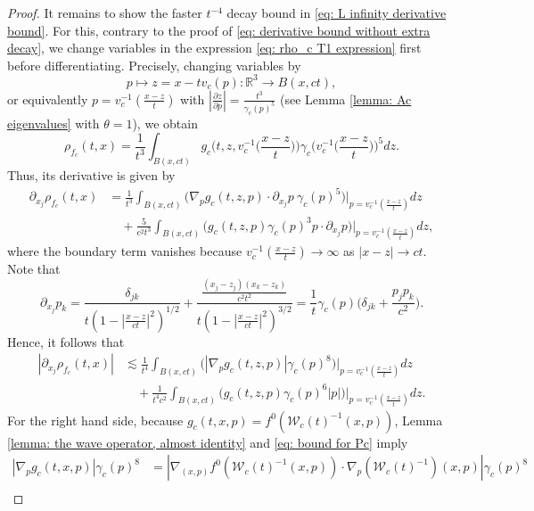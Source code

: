 \documentclass[reqno, 11pt, letterpaper]{amsart}
\theoremstyle{remark}
\numberwithin{equation}{section}
\numberwithin{theorem}{section}
\numberwithin{table}{section}
\numberwithin{figure}{section}
\begin{document}
\begin{proof}
It remains to show the faster $t^{-4}$ decay bound in \eqref{eq: L infinity derivative bound}. For this, contrary to the proof of \eqref{eq: derivative bound without extra decay}, we change variables in the expression \eqref{eq: rho_c T1 expression} first before differentiating. Precisely, changing variables by
$$p\mapsto z=x-tv_c(p):\mathbb{R}^3\to B(x,ct),$$
or equivalently $p=v_c^{-1}\left ( \frac{x-z}{t} \right )$ with $|\frac{\partial z}{\partial p}|=\frac{t^3}{\gamma_c(p)^5}$ (see Lemma \ref{lemma: Ac eigenvalues} with $\theta=1$), we obtain
\begin{equation}\label{eq: fc wave operator formulation, density}
\rho_{f_c}(t,x)=\frac{1}{t^3}\int_{B(x,ct)} g_c\bigg(t, z,v_c^{-1}\bigg(\frac{x-z}{t}\bigg)\bigg)\gamma_c \bigg(v_c^{-1}\bigg(\frac{x-z}{t}\bigg)\bigg)^5 dz.
\end{equation}
Thus, its derivative is given by
$$\begin{aligned}
\partial_{x_j}\rho_{f_c}(t,x)&=\frac{1}{t^3}\int_{B(x,ct)} \biggl(\nabla_p g_c(t,z, p)\cdot \partial_{x_j}p \  \gamma_c(p)^5 \biggr) \biggl |_{p=v_c^{-1} \left (\frac{x-z}{t} \right)} dz\\
&\quad+\frac{5}{c^2 t^3}\int_{B(x,ct)} \biggl (g_c(t,z, p) \gamma_c(p)^3 p \cdot \partial_{x_j} p \biggr ) \biggl |_{p=v_c^{-1} \left (\frac{x-z}{t} \right)}  dz,
\end{aligned}$$
where the boundary term vanishes because $v_c^{-1} \left (\frac{x-z}{t} \right) \to \infty$ as $|x-z|\to ct$. Note that $$\partial_{x_j}p_k=\frac{\delta_{jk}}{t(1-|\frac{x-z}{ct}|^2)^{1/2}}+\frac{\frac{(x_j-z_j)(x_k-z_k)}{c^2t^2}}{t(1-|\frac{x-z}{ct}|^2)^{3/2}}=\frac{1}{t} \gamma_c(p) \bigg(\delta_{jk}+\frac{p_jp_k}{c^2}\bigg).$$
Hence, it follows that 
$$\begin{aligned}
|\partial_{x_j}\rho_{f_c}(t,x)|&\lesssim\frac{1}{t^4}\int_{B(x,ct)} \biggl ( |\nabla_p g_c(t,z,p)| \gamma_c(p)^8 \bigg) \biggl |_{p=v_c^{-1} \left (\frac{x-z}{t} \right)} dz\\
&\quad+\frac{1}{t^4c^2}\int_{B(x,ct)} \biggl (g_c(t,z,p)  \gamma_c(p)^6 |p| \biggr ) \biggl |_{p=v_c^{-1} \left (\frac{x-z}{t} \right)} dz.
\end{aligned}$$
For the right hand side, because $g_c(t,x,p)=f^0(\mathcal{W}_c(t)^{-1}(x,p))$, Lemma \ref{lemma:  the wave operator, almost identity} and \eqref{eq: bound for Pc} imply
$$\begin{aligned}
|\nabla_p g_c(t,x,p)| \gamma_c(p)^8&=|\nabla_{(x,p)}f^0(\mathcal{W}_c(t)^{-1}(x,p))\cdot \nabla_p(\mathcal{W}_c(t)^{-1})(x,p)|\gamma_c(p)^8\\

\end{aligned}$$
\end{proof}
\end{document}
